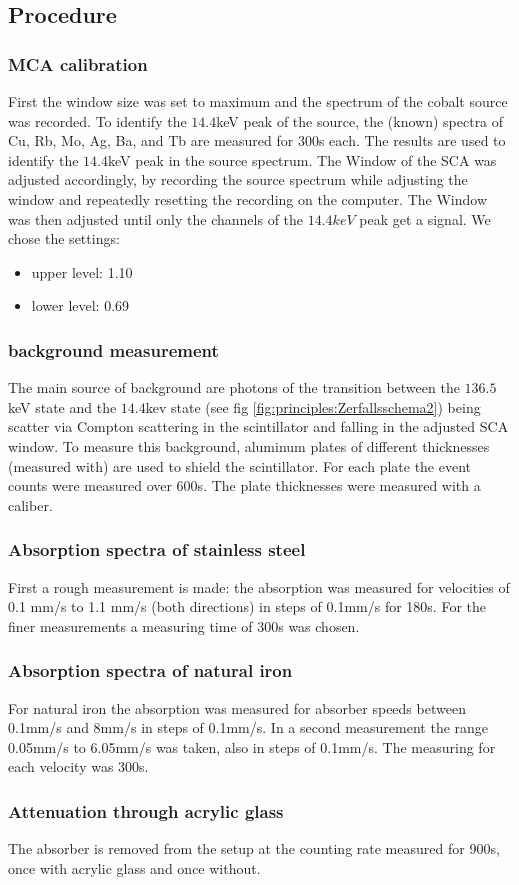 \subsection{Procedure}
\subsubsection{MCA calibration}
First the window size was set to maximum and the spectrum of the cobalt source was recorded.
To identify the $14.4$keV peak of the source, the (known) spectra of Cu, Rb, Mo, Ag, Ba, and Tb are measured for 300s each. The results are used to identify the $14.4$keV peak in the source spectrum. The Window of the SCA was adjusted accordingly, by recording the source spectrum while adjusting the window and repeatedly resetting the recording on the computer. The Window was then adjusted until only the channels of the $14.4keV$ peak get a signal. We chose the settings:
\begin{itemize}
	\item upper level: 1.10
	\item lower level: 0.69
\end{itemize}

\subsubsection{background measurement}
The main source of background are photons of the transition between the $136.5$keV state and the $14.4$kev state (see fig \ref{fig:principles:Zerfallsschema2}) being scatter via Compton scattering in the scintillator and falling in the adjusted SCA window. To measure this background, aluminum plates of different thicknesses (measured with) are used to shield the scintillator. For each plate the event counts were measured over 600s. The plate thicknesses were measured with a caliber. 

\subsubsection{Absorption spectra of stainless steel}
First a rough measurement is made: the absorption was measured for velocities of 0.1 mm/s to 1.1 mm/s (both directions) in steps of 0.1mm/s for 180s. For the finer measurements a measuring time of 300s was chosen.
\subsubsection{Absorption spectra of natural iron}
For natural iron the absorption was measured for absorber speeds between 0.1mm/s and 8mm/s in steps of 0.1mm/s. In a second measurement the range 0.05mm/s to 6.05mm/s was taken, also in steps of 0.1mm/s. The measuring for each velocity was 300s.
\subsubsection{Attenuation through acrylic glass}
The absorber is removed from the setup at the counting rate measured for 900s, once with acrylic glass and once without.
